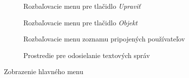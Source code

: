 \begin{figure}[H]
\begin{subfigure}[t]{0.48\linewidth}
		\caption{Rozbaľovacie menu pre tlačidlo \textit{Upraviť}}
	\end{subfigure}
	\quad
	\begin{subfigure}[t]{0.48\linewidth}	
		\caption{Rozbaľovacie menu pre tlačidlo \textit{Objekt} }
	\end{subfigure}
	\quad
	\begin{subfigure}[t]{0.48\linewidth}	
		\caption{Rozbaľovacie menu zoznamu pripojených používateľov  }
	\end{subfigure}
	\quad
	\begin{subfigure}[t]{0.48\linewidth}	
		\caption{Prostredie pre odosielanie textových správ}
	\end{subfigure}
	\caption{Zobrazenie hlavného menu}
\end{figure}


